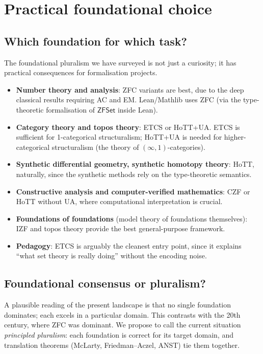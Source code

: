 \documentclass[12pt]{article}
\theoremstyle{definition}
\theoremstyle{remark}
\begin{document}
\section{Practical foundational choice}
\label{sec:practical}

\subsection{Which foundation for which task?}

The foundational pluralism we have surveyed is not just a curiosity; it has practical
consequences for formalisation projects.

\begin{itemize}
\item \textbf{Number theory and analysis}: ZFC variants are best, due to the deep classical
results requiring AC and EM. Lean/Mathlib uses ZFC (via the type-theoretic
formalisation of $\mathsf{ZFSet}$ inside Lean).
\item \textbf{Category theory and topos theory}: ETCS or HoTT+UA. ETCS is sufficient for
1-categorical structuralism; HoTT+UA is needed for higher-categorical structuralism (the
theory of $(\infty,1)$-categories).
\item \textbf{Synthetic differential geometry, synthetic homotopy theory}: HoTT, naturally,
since the synthetic methods rely on the type-theoretic semantics.
\item \textbf{Constructive analysis and computer-verified mathematics}: CZF or HoTT
without UA, where computational interpretation is crucial.
\item \textbf{Foundations of foundations} (model theory of foundations themselves): IZF
and topos theory provide the best general-purpose framework.
\item \textbf{Pedagogy}: ETCS is arguably the cleanest entry point, since it explains
``what set theory is really doing'' without the encoding noise.
\end{itemize}

\subsection{Foundational consensus or pluralism?}

A plausible reading of the present landscape is that no single foundation dominates;
each excels in a particular domain. This contrasts with the 20th century, where ZFC was
dominant. We propose to call the current situation \emph{principled pluralism}: each
foundation is correct for its target domain, and translation theorems (McLarty,
Friedman--Aczel, ANST) tie them together.
\end{document}
